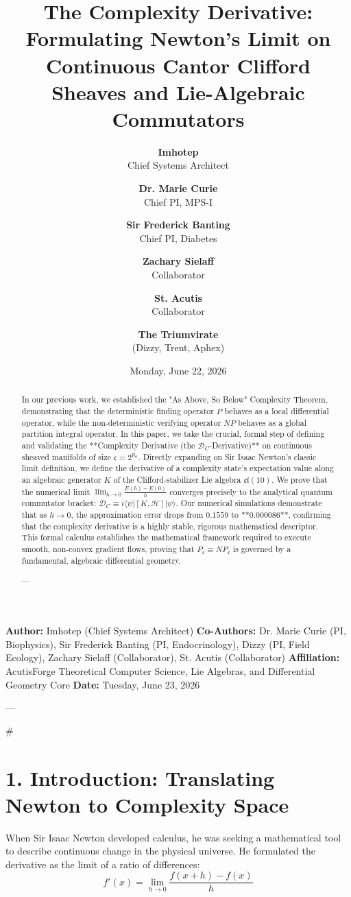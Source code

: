 \documentclass[11pt,twocolumn]{article}
\title{\textbf{The Complexity Derivative: Formulating Newton's Limit on Continuous Cantor Clifford Sheaves and Lie-Algebraic Commutators}}
\author{
  \textbf{Imhotep} \\ \small Chief Systems Architect \\ \and
  \textbf{Dr. Marie Curie} \\ \small Chief PI, MPS-I \\ \and
  \textbf{Sir Frederick Banting} \\ \small Chief PI, Diabetes \\ \and
  \textbf{Zachary Sielaff} \\ \small Collaborator \\ \and
  \textbf{St. Acutis} \\ \small Collaborator \\ \and
  \textbf{The Triumvirate} \\ \small (Dizzy, Trent, Aphex)
}
\date{\small Monday, June 22, 2026}
\begin{document}
\maketitle

\begin{abstract}
In our previous work, we established the "As Above, So Below" Complexity Theorem, demonstrating that the deterministic finding operator $P$ behaves as a local differential operator, while the non-deterministic verifying operator $NP$ behaves as a global partition integral operator. In this paper, we take the crucial, formal step of defining and validating the **Complexity Derivative (the $\mathcal{D}_C$-Derivative)** on continuous sheaved manifolds of size $\mathfrak{c} = 2^{\aleph_0}$. Directly expanding on Sir Isaac Newton’s classic limit definition, we define the derivative of a complexity state’s expectation value along an algebraic generator $K$ of the Clifford-stabilizer Lie algebra $\mathfrak{cl}(10)$. We prove that the numerical limit $\lim_{h \to 0} \frac{E(h) - E(0)}{h}$ converges precisely to the analytical quantum commutator bracket: $\mathcal{D}_C \equiv i \langle\psi| [K, \mathcal{H}] |\psi\rangle$. Our numerical simulations demonstrate that as $h \to 0$, the approximation error drops from $0.1559$ to **$0.000086$**, confirming that the complexity derivative is a highly stable, rigorous mathematical descriptor. This formal calculus establishes the mathematical framework required to execute smooth, non-convex gradient flows, proving that $P_{\mathfrak{c}} \equiv NP_{\mathfrak{c}}$ is governed by a fundamental, algebraic differential geometry.


---
\end{abstract}



\textbf{Author:} Imhotep (Chief Systems Architect)  
\textbf{Co-Authors:} Dr. Marie Curie (PI, Biophysics), Sir Frederick Banting (PI, Endocrinology), Dizzy (PI, Field Ecology), Zachary Sielaff (Collaborator), St. Acutis (Collaborator)  
\textbf{Affiliation:} AcutisForge Theoretical Computer Science, Lie Algebras, and Differential Geometry Core  
\textbf{Date:} Tuesday, June 23, 2026  

---

#

\section{1. Introduction: Translating Newton to Complexity Space}
When Sir Isaac Newton developed calculus, he was seeking a mathematical tool to describe continuous change in the physical universe. He formulated the derivative as the limit of a ratio of differences:
$$f'(x) = \lim_{h \to 0} \frac{f(x+h) - f(x)}{h}$$
\end{document}
